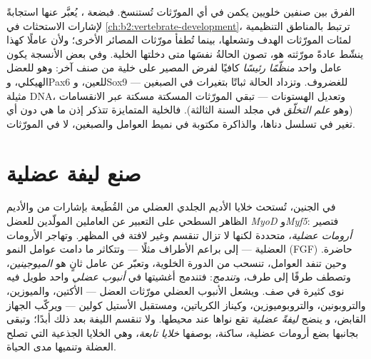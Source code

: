 \begin{proposition}\label{prop:b2:cell-differentiation:transcriptional}
الفرق بين صنفين خلويين يكمن في أي المورّثات
تُستنسخ. فبضعة \emph{}، يُعبَّر عنها
استجابةً لإشارات الاستحثاث في
\cref{ch:b2:vertebrate-development}، ترتبط بالمناطق التنظيمية
لمئات المورّثات الهدف وتشعلها، بينما تُطفأ مورّثات
المصائر الأخرى؛ ولأن عاملًا كهذا ينشّط عادةً
مورّثته هو، تصون الحالةُ نفسَها متى دخلتها الخلية.
وفي بعض الأنسجة يكون عامل واحد \emph{منظّمًا رئيسًا}
كافيًا لفرض المصير على خلية من صنف آخر: وهو 
للعضل الهيكلي، وPax6 للعين، وSox9 للغضروف. وتزداد الحالة
ثباتًا بتغيرات في الصبغين --- مثيلة
DNA، وتعديل الهستونات --- تبقي المورّثات المسكتة
مسكتة عبر الانقسامات (وهو \emph{علم التخلّق} في مجلد السنة
الثالثة). فالخلية المتمايزة تتذكر إذن ما هي
دون أي تغير في تسلسل دناها، والذاكرة مكتوبة
في نميط العوامل والصبغين، لا في المورّثات.
\end{proposition}

\section{صنع ليفة عضلية}

\begin{definition}\label{def:b2:cell-differentiation:myogenesis}
في الجنين، تُستحث خلايا الأديم الجلدي العضلي من القُطَيعة
بإشارات من   والأديم الظاهر السطحي على
التعبير عن العاملين المولّدين للعضل \emph{MyoD} و\emph{Myf5}: فتصير
\emph{أرومات عضلية}، متحددة لكنها لا تزال تنقسم وغير لافتة
في المظهر. وتهاجر الأرومات العضلية --- إلى براعم الأطراف مثلًا
--- وتتكاثر ما دامت عوامل النمو (FGF) حاضرة. وحين
تنفد العوامل، تنسحب من الدورة الخلوية، وتعبّر عن
عامل ثانٍ هو \emph{الميوجينين}، وتصطف طرفًا إلى طرف، و\emph{تندمج}:
فتندمج أغشيتها في \emph{أنبوب عضلي} واحد طويل فيه نوى
كثيرة في صف. ويشعل الأنبوب العضلي مورّثات العضل ---
الأكتين، والميوزين، والتروبونين، والتروبوميوزين، وكيناز الكرياتين،
ومستقبل الأستيل كولين --- ويركّب الجهاز القابض، و
ينضج \emph{ليفةً عضلية} تقع نواها عند
محيطها. ولا تنقسم الليفة بعد ذلك أبدًا؛ وتبقى بجانبها بضع أرومات
عضلية، ساكنة، بوصفها \emph{خلايا تابعة}، وهي الخلايا الجذعية
التي تصلح العضلة وتنميها مدى الحياة.
\end{definition}

